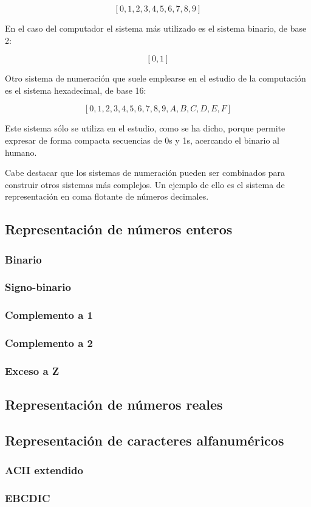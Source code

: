 \documentclass[a4paper, 11pt, titlepage]{article}
\begin{document}
        \[[0,1,2,3,4,5,6,7,8,9]\]

        En el caso del computador el sistema más utilizado es el sistema binario, de base 2:

        \[[0,1]\]

        Otro sistema de numeración que suele emplearse en el estudio de la computación es el 
        sistema hexadecimal, de base 16:

        \[[0,1,2,3,4,5,6,7,8,9,A,B,C,D,E,F]\]

        Este sistema sólo se utiliza en el estudio, como se ha dicho, porque permite expresar de 
        forma compacta secuencias de 0s y 1s, acercando el binario al humano.

        Cabe destacar que los sistemas de numeración pueden ser combinados para construir otros 
        sistemas más complejos. Un ejemplo de ello es el sistema de representación en coma 
        flotante de números decimales.

    \subsection{Representación de números enteros}

        \subsubsection{Binario}

        \subsubsection{Signo-binario}

        \subsubsection{Complemento a 1}

        \subsubsection{Complemento a 2}

        \subsubsection{Exceso a Z}

    \subsection{Representación de números reales}

    \subsection{Representación de caracteres alfanuméricos}

        \subsubsection{ACII extendido}

        \subsubsection{EBCDIC}
\end{document}
